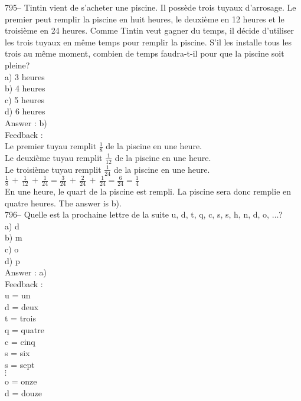 \documentclass[letterpaper, 12pt]{article}
\begin{document}
795-- Tintin vient de s'acheter une piscine.  Il poss\`ede trois tuyaux
d'arrosage.  Le premier peut remplir la piscine en huit heures, le
deuxi\`eme en 12 heures et le troisi\`eme en 24 heures.  Comme Tintin veut
gagner du temps, il d\'ecide d'utiliser les trois tuyaux en m\^eme temps
pour remplir la piscine.  S'il les installe tous les trois au m\^eme moment,
combien de temps faudra-t-il pour que la piscine soit pleine?\\
a) 3 heures\\
b) 4 heures\\
c) 5 heures\\
d) 6 heures\\

Answer : b)\\

Feedback : \\
Le premier tuyau remplit $\frac{1}{8}$ de la piscine en une heure.\\[2mm]
Le deuxi\`eme tuyau remplit $\frac{1}{12}$ de la piscine en une
heure.\\[2mm]
Le troisi\`eme tuyau remplit $\frac{1}{24}$ de la piscine en une
heure.\\[2mm]
$\frac{1}{8}\,+\,\frac{1}{12}\,+\,\frac{1}{24}=\frac{3}{24}\,+\,\frac{2}{24}\,+\,\frac{1}{24}=\frac{6}{24}=\frac{1}{4}$\\[2mm]
En une heure, le quart de la piscine est rempli.  La piscine sera donc
remplie en quatre heures.  The answer is b).\\

796-- Quelle est la prochaine lettre de la suite u, d, t, q, c, s, s, h, n,
d, o, $\ldots$?\\
a) d\\
b) m\\
c) o\\
d) p\\

Answer : a)\\

Feedback : \\
u = un\\
d = deux\\
t = trois\\
q = quatre\\
c = cinq\\
s = six\\
s = sept\\
$\vdots$\\
o = onze\\
d = douze\\
\end{document}
